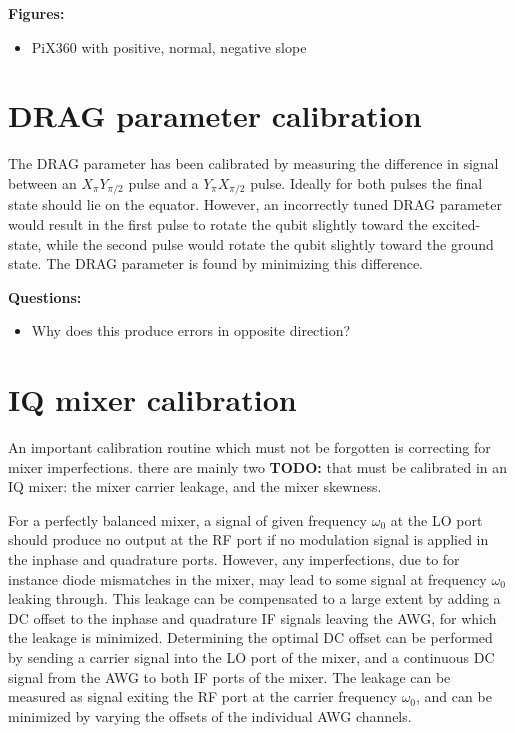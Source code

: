       \textbf{Figures:}
      \begin{itemize}
        \item PiX360 with positive, normal, negative slope
      \end{itemize}

    \section{DRAG parameter calibration}
      The DRAG parameter has been calibrated by measuring the difference in signal between an $X_{\pi} Y_{\pi/2}$ pulse and a $Y_{\pi} X_{\pi/2}$ pulse. Ideally for both pulses the final state should lie on the equator. However, an incorrectly tuned DRAG parameter would result in the first pulse to rotate the qubit slightly toward the excited-state, while the second pulse would rotate the qubit slightly toward the ground state. The DRAG parameter is found by minimizing this difference.

      \textbf{Questions:}
      \begin{itemize}
        \item Why does this produce errors in opposite direction?
      \end{itemize}

    \section{IQ mixer calibration}
      \label{sec:Mixer calibration}
      An important calibration routine which must not be forgotten is correcting for mixer imperfections. there are mainly two \textbf{TODO:} that must be calibrated in an IQ mixer: the mixer carrier leakage, and the mixer skewness.

      For a perfectly balanced mixer, a signal of given frequency $\omega_0$ at the LO port should produce no output at the RF port if no modulation signal is applied in the inphase and quadrature ports.  However, any imperfections, due to for instance diode mismatches in the mixer, may lead to some signal at frequency $\omega_0$ leaking through. This leakage can be compensated to a large extent by adding a DC offset to the inphase and quadrature IF signals leaving the AWG, for which the leakage is minimized. Determining the optimal DC offset can be performed by sending a carrier signal into the LO port of the mixer, and a continuous DC signal from the AWG to both IF ports of the mixer. The leakage can be measured as signal exiting the RF port at the carrier frequency $\omega_0$, and can be minimized by varying the offsets of the individual AWG channels.

